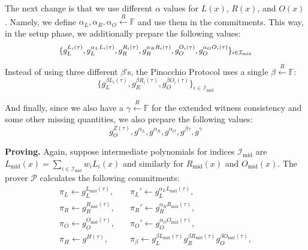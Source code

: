 \documentclass[../lecture-notes.tex]{subfiles}
\begin{document}
The next change is that we use different $\alpha$ values for $L(x)$, $R(x)$, and $O(x)$. Namely, we define $\alpha_L,\alpha_R,\alpha_O \xleftarrow{R} \mathbb{F}$ and use them in the commitments. This way, in the setup phase, we additionally prepare the following values:
\begin{equation*}
    \scalebox{0.95}{$\{g_L^{L_i(\tau)}, g_L^{\alpha_LL_i(\tau)}, g_R^{R_i(\tau)}, g_R^{\alpha_RR_i(\tau)}, g_O^{O_i(\tau)}, g_O^{\alpha_O O_i(\tau)}\}_{i \in \mathcal{I}_{\text{mid}}}$}
\end{equation*}

Instead of using three different $\beta$'s, the Pinocchio Protocol uses a single $\beta \xleftarrow{R} \mathbb{F}$:
\begin{equation*}
    \{g_L^{\beta L_i(\tau)}, g_R^{\beta R_i(\tau)},g_O^{\beta O_i(\tau)} \}_{i \in \mathcal{I}_{\text{mid}}}
\end{equation*}

And finally, since we also have a $\gamma \xleftarrow{R} \mathbb{F}$ for the extended witness consistency and some other missing quantities, we also prepare the following values:
\begin{equation*}
    g_O^{Z(\tau)}, g^{\alpha_L}, g^{\alpha_R}, g^{\alpha_O},g^{\beta\gamma}, g^{\gamma}
\end{equation*}

\textcolor{green!50!black}{\textbf{Proving.}} Again, suppose intermediate polynomials for indices $\mathcal{I}_{\text{mid}}$ are $L_{\text{mid}}(x) = \sum_{i \in \mathcal{I}_{\text{mid}}}w_iL_i(x)$ and similarly for $R_{\text{mid}}(x)$ and $O_{\text{mid}}(x)$. The prover $\mathcal{P}$ calculates the following commitments:
\begin{align*}
    \pi_L \gets g_L^{L_{\text{mid}}(\tau)}, & \quad \pi_L' \gets g_L^{\alpha_LL_{\text{mid}}(\tau)}, \\
    \pi_R \gets g_R^{R_{\text{mid}}(\tau)}, & \quad \pi_R' \gets g_R^{\alpha_RR_{\text{mid}}(\tau)}, \\
    \pi_O \gets g_O^{O_{\text{mid}}(\tau)}, & \quad \pi_O' \gets g_O^{\alpha_OO_{\text{mid}}(\tau)}, \\
    \pi_H \gets g^{H(\tau)},                & \quad \pi_{\beta} \gets g_L^{\beta L_{\text{mid}}(\tau)}g_R^{\beta R_{\text{mid}}(\tau)}g_O^{\beta O_{\text{mid}}(\tau)},
\end{align*}
\end{document}
